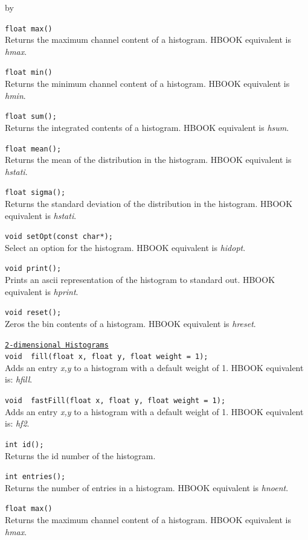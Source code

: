\documentclass[twoside]{article}
\newcommand{\comp}[1]{\texttt{#1}}%
\newcommand{\entrylabel}[1]{\mbox{\textbf{{#1}}}\hfil}%
\newenvironment{entry}
{\begin{list}{}%
    {\renewcommand{\makelabel}{\entrylabel}%
     \setlength{\labelwidth}{90pt}%
     \setlength{\leftmargin}{\labelwidth}
     \advance\leftmargin by \labelsep%
      }%
    }%
  {\end{list}}
\newcommand{\Entrylabel}[1]%
{\raisebox{0pt}[1ex][0pt]{\makebox[\labelwidth][l]%
    {\parbox[t]{\labelwidth}{\hspace{0pt}\textbf{{#1}}}}}}
\newenvironment{Entry}%
{\renewcommand{\entrylabel}{\Entrylabel}\begin{entry}}%
  {\end{entry}}
\begin{document}
\begin{description}
\begin{Entry}
  \verb+float max()+\\
  Returns the maximum channel content of a histogram.  HBOOK equivalent
  is {\em hmax}.

  \verb+float min()+\\
  Returns the minimum channel content of a histogram.  HBOOK equivalent
  is {\em hmin}.
  
  \verb+float sum();+\\
  Returns the integrated contents of a histogram.  HBOOK equivalent
  is {\em hsum}.

  \verb+float mean();+\\
  Returns the mean of the distribution in the histogram.
  HBOOK equivalent is {\em hstati}.
  
  \verb+float sigma();+\\
  Returns the standard deviation of the distribution in the histogram.
  HBOOK equivalent is {\em hstati}.
  
  \verb+void setOpt(const char*);+\\
  Select an option for the histogram.  HBOOK equivalent is {\em hidopt}.
  
  \verb+void print();+\\
  Prints an ascii representation of the histogram to standard out.
  HBOOK equivalent is {\em hprint}.
  
  \verb+void reset();+\\
  Zeros the bin contents of a histogram.  HBOOK equivalent is {\em hreset}.

  \comp{\underline{2-dimensional Histograms}}\\
  \verb+void  fill(float x, float y, float weight = 1);+\\
  Adds an entry {\em x,y} to a histogram with a default weight of 1.
  HBOOK equivalent is: {\em hfill}.

  \verb+void  fastFill(float x, float y, float weight = 1);+\\
  Adds an entry {\em x,y} to a histogram with a default weight of 1.
  HBOOK equivalent is: {\em hf2}.

  \verb+int id();+\\
  Returns the id number of the histogram. 

  \verb+int entries();+\\
  Returns the number of entries in a histogram.  HBOOK equivalent
  is {\em  hnoent}.
  
  \verb+float max()+\\
  Returns the maximum channel content of a histogram.  HBOOK equivalent
  is {\em hmax}.


\end{Entry}
\end{description}
\end{document}
